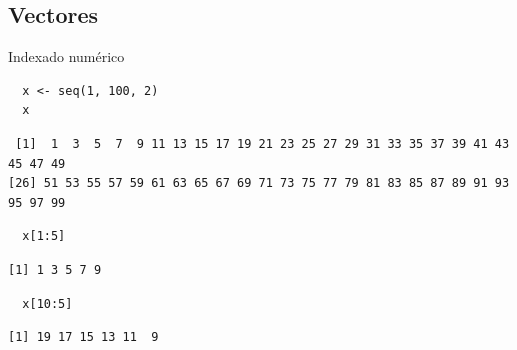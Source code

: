 \documentclass[xcolor={usenames,svgnames,dvipsnames}]{beamer}
\begin{document}
\subsection{Vectores}
\label{sec-3-1}
\begin{frame}[fragile,label=sec-3-1-1]{Indexado numérico}
 \lstset{language=R,label= ,caption= ,numbers=none}
\begin{lstlisting}
  x <- seq(1, 100, 2)
  x
\end{lstlisting}

\begin{verbatim}
 [1]  1  3  5  7  9 11 13 15 17 19 21 23 25 27 29 31 33 35 37 39 41 43 45 47 49
[26] 51 53 55 57 59 61 63 65 67 69 71 73 75 77 79 81 83 85 87 89 91 93 95 97 99
\end{verbatim}

\lstset{language=R,label= ,caption= ,numbers=none}
\begin{lstlisting}
  x[1:5]
\end{lstlisting}

\begin{verbatim}
[1] 1 3 5 7 9
\end{verbatim}

\lstset{language=R,label= ,caption= ,numbers=none}
\begin{lstlisting}
  x[10:5]
\end{lstlisting}

\begin{verbatim}
[1] 19 17 15 13 11  9
\end{verbatim}
\end{frame}
\end{document}
